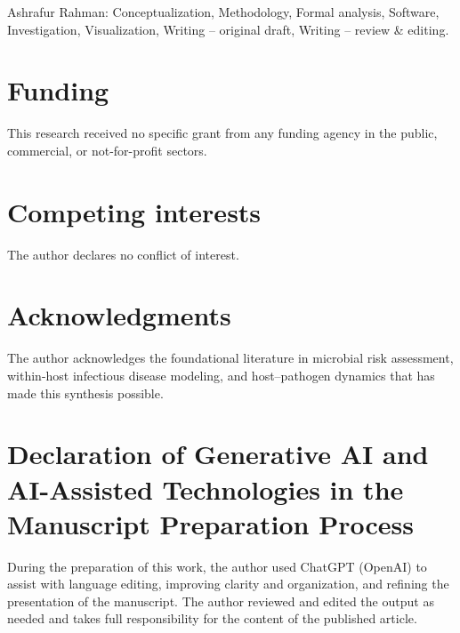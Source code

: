 \documentclass[11pt]{article}
\begin{document}
Ashrafur Rahman: Conceptualization, Methodology,
Formal analysis, Software, Investigation,
Visualization, Writing -- original draft,
Writing -- review \& editing.
\section*{Funding}

This research received no specific grant from any
funding agency in the public, commercial, or
not-for-profit sectors.
\section*{Competing interests}
The author declares no conflict of interest.

\section*{Acknowledgments}
The author acknowledges the foundational literature in microbial risk assessment, within-host infectious disease modeling, and host--pathogen dynamics that has made this synthesis possible.

\section*{Declaration of Generative AI and AI-Assisted Technologies in the Manuscript Preparation Process}

During the preparation of this work, the author used ChatGPT (OpenAI) to assist with language editing, improving clarity and organization, and refining the presentation of the manuscript. The author reviewed and edited the output as needed and takes full responsibility for the content of the published article.



\end{document}
